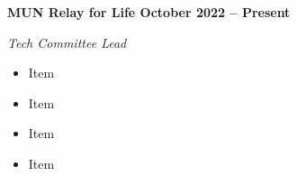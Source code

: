 \vspace{0.1cm}
\textbf{MUN Relay for Life \hfill October 2022 -- Present} \par
\textit{Tech Committee Lead} \par
\begin{itemize}
	\item Item
  \item Item
  \item Item
  \item Item
\end{itemize} \par